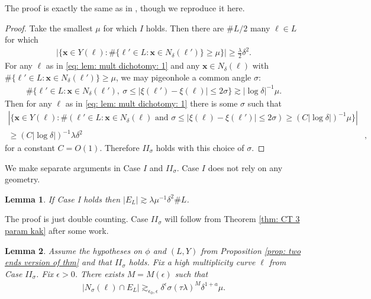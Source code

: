 \documentclass[12pt]{amsart}
\newcommand{\x}{{\bf{x}}}
\numberwithin{equation}{section}
\newtheorem{lemma}{Lemma}[section]
\newcommand{\1}{\mathbbm{1}}
\renewcommand{\x}{\mathbf x}
\begin{document}
The proof is exactly the same as in \cite{wolffHairbrush}, though we reproduce it here.
\begin{proof}
    Take the smallest $\mu$ for which $I$ holds. Then there are $\# L / 2$ many $\ell \in L$ for which 
    \begin{align}\label{eq: lem: mult dichotomy: 1}
        |\{\x \in Y(\ell) : 
            \# \{\ell' \in L : \x \in N_\delta(\ell')\} \geq \mu\}| \geq \frac{\lambda}{2} \delta^2.
    \end{align}
    For any $\ell$ as in \eqref{eq: lem: mult dichotomy: 1} and any $\x \in N_\delta(\ell)$ with $\# \{\ell' \in L : \x \in N_\delta(\ell')\} \geq \mu$, we may pigeonhole a common angle $\sigma$: 
    \begin{align}
        \#\{\ell' \in L : \x \in N_\delta(\ell'), \ \sigma \leq |\xi(\ell') - \xi(\ell)| \leq 2\sigma \} \gtrsim |\log \delta|^{-1} \mu. 
    \end{align}
    Then for any $\ell$ as in \eqref{eq: lem: mult dichotomy: 1} there is some $\sigma$ such that 
    \begin{align}
            |\{\x \in Y(\ell) : \#(\ell' \in L : \x\in N_\delta(\ell) \text{ and } \sigma \leq |\xi(\ell) - \xi(\ell')| \leq 2\sigma) 
			\geq (C |\log \delta|)^{-1} \mu\}|&\\
			\geq (C |\log \delta|)^{-1} \lambda \delta^2&,
        \end{align}
        for a constant $C = O(1)$. Therefore $II_\sigma$ holds with this choice of $\sigma$. 
\end{proof}

We make separate arguments in Case $I$ and $II_\sigma$. Case $I$ does not rely on any geometry. 

\begin{lemma}\label{lem: case I}
    If Case I holds then $|E_L| \gtrsim \lambda \mu^{-1} \delta^2 \#L$. 
\end{lemma}
The proof is just double counting. Case $II_\sigma$ will follow from Theorem \ref{thm: CT 3 param kak} after some work. 

\begin{lemma}\label{lem: case II}
    Assume the hypotheses on $\phi$ and $(L,Y)$ from Proposition \ref{prop: two ends version of thm} and that $II_\sigma$ holds. Fix a high multiplicity curve $\ell$ from Case $II_\sigma$. 
    Fix $\epsilon > 0$. There exists $M = M(\epsilon)$ such that 
    \begin{align}\label{eq: bound lem: case II}
        |N_\sigma(\ell) \cap E_L| \gtrsim_{\epsilon_0, \epsilon} \delta^\epsilon \sigma (\tau \lambda)^M \delta^{1 + a} \mu. 
    \end{align}
\end{lemma}
\end{document}
